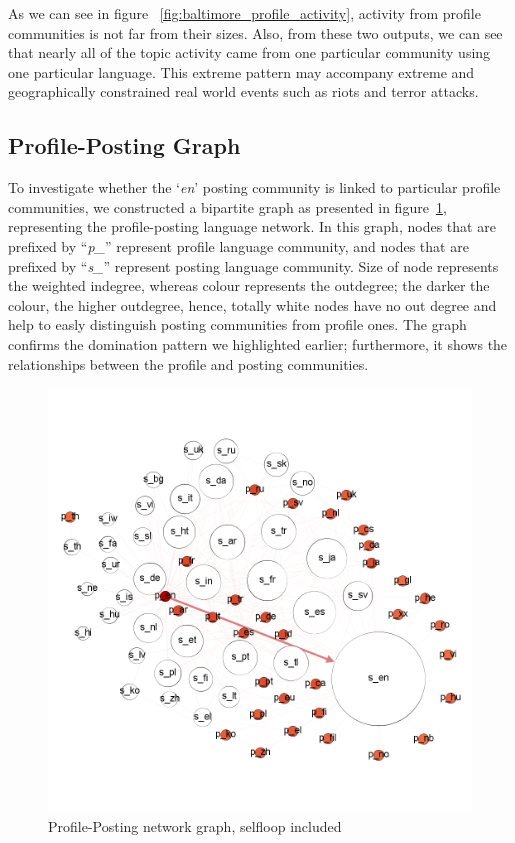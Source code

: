 As we can see in figure ~\ref{fig:baltimore_profile_activity}, 
activity from profile communities is not far from their sizes.
Also, from these two outputs, we can see that nearly all of the topic
activity came from one particular community using one particular
language. This extreme pattern may accompany extreme and
geographically constrained real world events such as riots and terror
attacks.


\subsection{Profile-Posting Graph}
To investigate whether the `{\emph{en}}' posting community is linked to
particular profile communities, we constructed a bipartite graph as
presented in figure~\ref{fig:baltimore_p_s_lang_sl}, representing the
profile-posting language network. In this graph, nodes that are
prefixed by ``{\emph{p\_}}'' represent profile language community, and
nodes that are prefixed by ``{\emph{s\_}}'' represent posting language
community. Size of node represents the weighted indegree, whereas colour
represents the outdegree; the darker the colour, the higher
outdegree, hence, totally white nodes have no out degree and help to easly distinguish posting communities from profile ones.
The graph confirms the domination pattern we highlighted
earlier; furthermore, it shows the relationships between the profile and
posting communities. 

\begin{figure}[htb]
\centering
\includegraphics[width=\columnwidth]{images/baltimore_p_s_lang_sl.png}
\caption{Profile-Posting network graph, selfloop included}
\label{fig:baltimore_p_s_lang_sl}
\end{figure}

